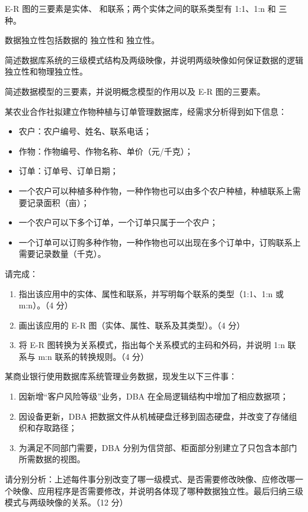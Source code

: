 \documentclass[a4paper,11pt]{article}
\begin{document}
\q E-R 图的三要素是实体、\fillblank{} 和联系；两个实体之间的联系类型有 1:1、1:n 和 \fillblank{} 三种。

\q 数据独立性包括数据的 \fillblank{} 独立性和 \fillblank{} 独立性。

\q 简述数据库系统的三级模式结构及两级映像，并说明两级映像如何保证数据的逻辑独立性和物理独立性。\anslines{2.2cm}

\q 简述数据模型的三要素，并说明概念模型的作用以及 E-R 图的三要素。\anslines{2.2cm}

\q 某农业合作社拟建立作物种植与订单管理数据库，经需求分析得到如下信息：
\begin{itemize}[leftmargin=1.6em, itemsep=1pt]
  \item 农户：农户编号、姓名、联系电话；
  \item 作物：作物编号、作物名称、单价（元/千克）；
  \item 订单：订单号、订单日期；
  \item 一个农户可以种植多种作物，一种作物也可以由多个农户种植，种植联系上需要记录面积（亩）；
  \item 一个农户可以下多个订单，一个订单只属于一个农户；
  \item 一个订单可以订购多种作物，一种作物也可以出现在多个订单中，订购联系上需要记录数量（千克）。
\end{itemize}

请完成：
\begin{enumerate}[label=（\arabic*）, leftmargin=2.4em, itemsep=1pt]
  \item 指出该应用中的实体、属性和联系，并写明每个联系的类型（1:1、1:n 或 m:n）。（4 分）
  \item 画出该应用的 E-R 图（实体、属性、联系及其类型）。（4 分）
  \item 将 E-R 图转换为关系模式，指出每个关系模式的主码和外码，并说明 1:n 联系与 m:n 联系的转换规则。（4 分）
\end{enumerate}
\anslines{4.5cm}

\q 某商业银行使用数据库系统管理业务数据，现发生以下三件事：
\begin{enumerate}[label=（\arabic*）, leftmargin=2.4em, itemsep=1pt]
  \item 因新增“客户风险等级”业务，DBA 在全局逻辑结构中增加了相应数据项；
  \item 因设备更新，DBA 把数据文件从机械硬盘迁移到固态硬盘，并改变了存储组织和存取路径；
  \item 为满足不同部门需要，DBA 分别为信贷部、柜面部分别建立了只包含本部门所需数据的视图。
\end{enumerate}

请分别分析：上述每件事分别改变了哪一级模式、是否需要修改映像、应修改哪一个映像、应用程序是否需要修改，并说明各体现了哪种数据独立性。最后归纳三级模式与两级映像的关系。（12 分）
\anslines{4.5cm}
\end{document}
